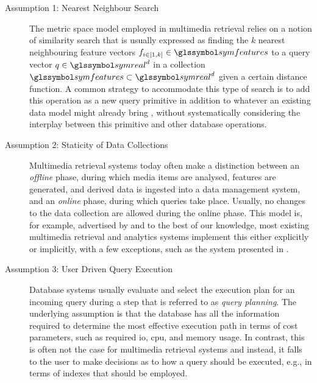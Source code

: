 \begin{description}
    \item[Assumption 1: Nearest Neighbour Search] The metric space model employed in multimedia retrieval \cite{Zezula:2006Similarity} relies on a notion of similarity search that is usually expressed as finding the $k$ nearest neighbouring feature vectors $f_{i \in \left[1,k\right]} \in \symfeatures$ to a query vector $q \in \symreal^d$ in a collection $\symfeatures \subset \symreal^d$ given a certain distance function. A common strategy to accommodate this type of search is to add this operation as a new query primitive in addition to whatever an existing data model might already bring \cite{Guliato:2009PostgreSQL,Giangreco:2016Adam,Yang:2020Pase}, without systematically considering the interplay between this primitive and other database operations.

    \item[Assumption 2: Staticity of Data Collections] Multimedia retrieval systems today often make a distinction between an \emph{offline} phase, during which media items are analysed, features are generated, and derived data is ingested into a data management system, and an \emph{online} phase, during which queries take place. Usually, no changes to the data collection are allowed during the online phase. This model is, for example, advertised by \cite{Flickner:1995Query,Kiranyaz:2003Muvis,Giangreco:2018Database,Rossetto:2018Multi} and to the best of our knowledge, most existing multimedia retrieval and analytics systems implement this either explicitly or implicitly, with a few exceptions, such as the system presented in \cite{Wang:2021Milvus}.

    \item[Assumption 3: User Driven Query Execution] Database systems usually evaluate and select the execution plan for an incoming query during a step that is referred to as \emph{query planning}. The underlying assumption is that the database has all the information required to determine the most effective execution path in terms of cost parameters, such as required \acrshort{io}, \acrshort{cpu}, and memory usage. In contrast, this is often not the case for multimedia retrieval systems and instead, it falls to the user to make decisions as to how a query should be executed, e.g., in terms of indexes that should be employed.
\end{description}

